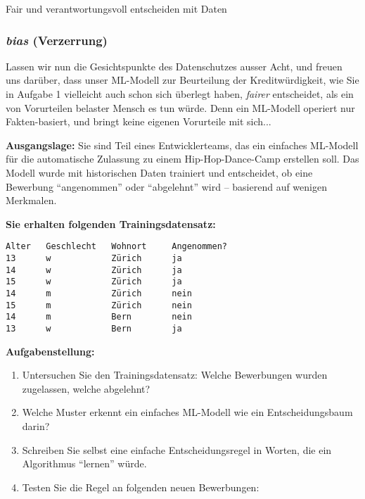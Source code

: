 \begin{lpu}{Fair und verantwortungsvoll entscheiden mit Daten}
\begin{aufgabe}{5}
\end{aufgabe}


\subsubsection*{\textit{bias} (Verzerrung)}
Lassen wir nun die Gesichtspunkte des Datenschutzes ausser Acht, und freuen uns darüber, dass unser ML-Modell zur Beurteilung der Kreditwürdigkeit, wie Sie in Aufgabe 1 vielleicht auch schon sich überlegt haben, \textit{fairer} entscheidet, als ein von Vorurteilen belaster Mensch es tun würde. Denn ein ML-Modell operiert nur Fakten-basiert, und bringt keine eigenen Vorurteile mit sich...

\begin{aufgabe}{6}

\textbf{Ausgangslage:}  
Sie sind Teil eines Entwicklerteams, das ein einfaches ML-Modell für die automatische Zulassung zu einem Hip-Hop-Dance-Camp erstellen soll. Das Modell wurde mit historischen Daten trainiert und entscheidet, ob eine Bewerbung ``angenommen'' oder ``abgelehnt'' wird – basierend auf wenigen Merkmalen.

\vspace{0.5em}
\textbf{Sie erhalten folgenden Trainingsdatensatz:}

\begin{centering}
\begin{verbatim}
Alter   Geschlecht   Wohnort     Angenommen?
13      w            Zürich      ja
14      w            Zürich      ja
15      w            Zürich      ja
14      m            Zürich      nein
15      m            Zürich      nein
14      m            Bern        nein
13      w            Bern        ja
\end{verbatim}
\end{centering}

\vspace{0.5em}
\textbf{Aufgabenstellung:}

\begin{enumerate}
  \item Untersuchen Sie den Trainingsdatensatz: Welche Bewerbungen wurden zugelassen, welche abgelehnt?
  \item Welche Muster erkennt ein einfaches ML-Modell wie ein Entscheidungsbaum darin?
  \item Schreiben Sie selbst eine einfache Entscheidungsregel in Worten, die ein Algorithmus ``lernen'' würde.
  \item Testen Sie die Regel an folgenden neuen Bewerbungen:
  

\end{enumerate}
\end{aufgabe}
\end{lpu}
